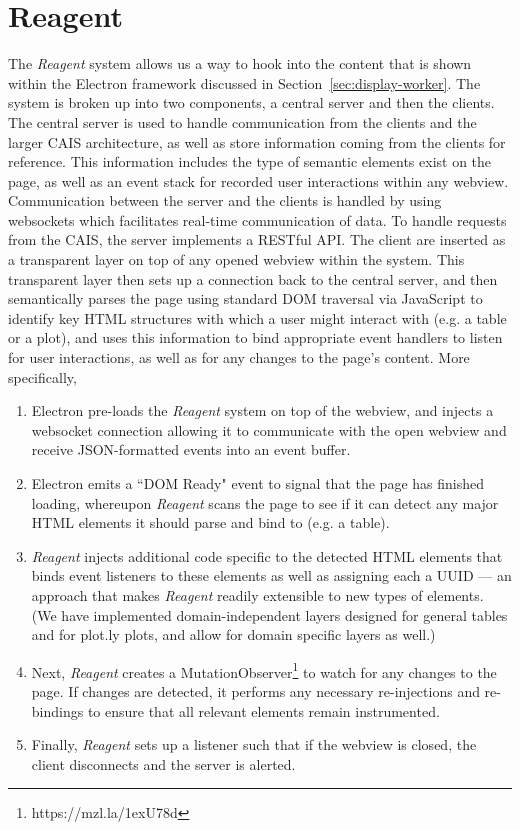 \section{Reagent}\label{sec:reagent}

The \textit{Reagent} system allows us a way to hook into the content that is
shown within the Electron framework discussed in Section~\ref{sec:display-worker}. The
system is broken up into two components, a central server and then the clients.
The central server is used to handle communication from the clients and the
larger CAIS architecture, as well as store information coming from the clients
for reference. This information includes the type of semantic elements exist on
the page, as well as an event stack for recorded user interactions within any
webview. Communication between the server and the clients is handled by using
websockets which facilitates real-time communication of data. To handle requests
from the CAIS, the server implements a RESTful API. The client are inserted as a
transparent layer on top of any opened webview within the system.  This
transparent layer then sets up a connection back to the central server, and then
semantically parses the page using standard DOM traversal via JavaScript
to identify key HTML structures with which a user
might interact with (e.g. a table or a plot), and uses this information to bind
appropriate event handlers to listen for user interactions, as well as for any
changes to the page's content. More specifically,

\begin{enumerate}
    \item Electron pre-loads the \textit{Reagent} system on top of the webview, and injects a websocket connection allowing it to communicate with the open webview and receive JSON-formatted events into an event buffer.
    \item Electron emits a ``DOM Ready" event to signal that the page has finished loading, whereupon \textit{Reagent} scans the page to see if it can detect any major HTML elements it should parse and bind to (e.g. a table).
    \item \textit{Reagent} injects additional code specific to the detected HTML elements that binds event listeners to these elements as well as assigning each a UUID --- an approach that makes \textit{Reagent} readily extensible to new types of elements. (We have implemented domain-independent layers designed for general tables and for plot.ly plots, and allow for domain specific layers as well.)
    \item Next, \textit{Reagent} creates a MutationObserver\footnote{https://mzl.la/1exU78d} to watch for any changes to the page. If changes are detected, it performs any necessary re-injections and re-bindings to ensure that all relevant elements remain instrumented.
    \item Finally, \textit{Reagent} sets up a listener such that if the webview
    is closed, the client disconnects and the server is alerted.
\end{enumerate}

